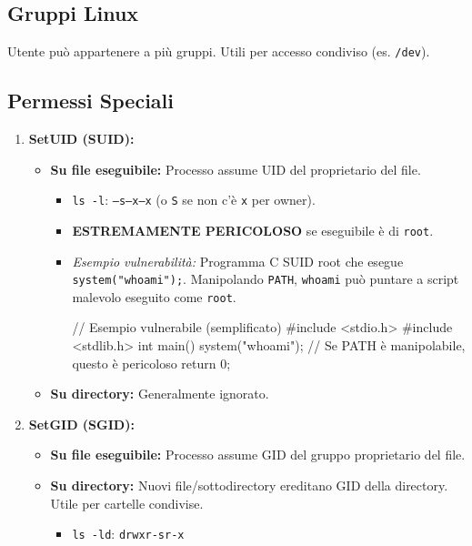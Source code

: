 \documentclass{article}
\begin{document}
\subsection{Gruppi Linux}
Utente può appartenere a più gruppi. Utili per accesso condiviso (es. \texttt{/dev}).

\subsection{Permessi Speciali}
\begin{enumerate}
    \item \textbf{SetUID (SUID):}
    \begin{itemize}
        \item \textbf{Su file eseguibile:} Processo assume UID del proprietario del file.
        \begin{itemize}
            \item \texttt{ls -l}: \texttt{---s--x--x} (o \texttt{S} se non c'è \texttt{x} per owner).
            \item \textbf{ESTREMAMENTE PERICOLOSO} se eseguibile è di \texttt{root}.
            \item \textit{Esempio vulnerabilità:} Programma C SUID root che esegue \texttt{system("whoami");}. Manipolando \texttt{PATH}, \texttt{whoami} può puntare a script malevolo eseguito come \texttt{root}.
            \begin{ccode}
// Esempio vulnerabile (semplificato)
#include <stdio.h>
#include <stdlib.h>
int main() {
    system("whoami"); // Se PATH è manipolabile, questo è pericoloso
    return 0;
}
            \end{ccode}
        \end{itemize}
        \item \textbf{Su directory:} Generalmente ignorato.
    \end{itemize}

    \item \textbf{SetGID (SGID):}
    \begin{itemize}
        \item \textbf{Su file eseguibile:} Processo assume GID del gruppo proprietario del file.
        \item \textbf{Su directory:} Nuovi file/sottodirectory ereditano GID della directory. Utile per cartelle condivise.
        \begin{itemize}
            \item \texttt{ls -ld}: \texttt{drwxr-sr-x}
        \end{itemize}
    \end{itemize}


\end{enumerate}
\end{document}

